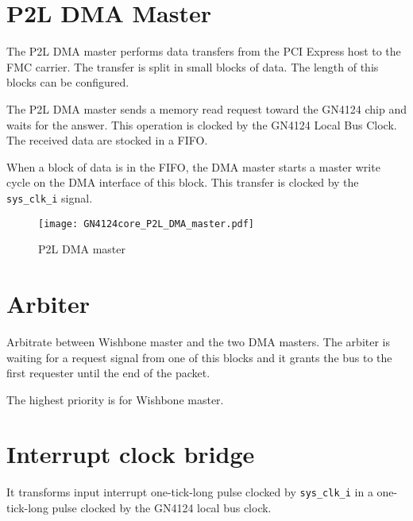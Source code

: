 \documentclass[10pt,a4paper]{cerndoc}
\begin{document}
 \section{P2L DMA Master}
The P2L DMA master performs data transfers from the PCI Express host to the FMC carrier. The transfer is split in small blocks of data. The length of this blocks can be configured.
 
The P2L DMA master sends a memory read request toward the GN4124 chip and waits for the answer. This operation is clocked by the GN4124 Local Bus Clock. The received data are stocked in a FIFO. 
 
When a block of data is in the FIFO, the DMA master starts a master write cycle on the DMA interface of this block. This transfer is clocked by the \verb+sys_clk_i+ signal. 
 
 \begin{figure}[!ht]
	\centering
		\texttt{[image: GN4124core\_P2L\_DMA\_master.pdf]}
	\caption{P2L DMA master}
	\label{fig:GN4124core_p2l_dma_master}
\end{figure}
 
 \section{Arbiter}
Arbitrate between Wishbone master and the two DMA masters. The arbiter is waiting for a request signal from one of this blocks and it grants the bus to the first requester until the end of the packet.

The highest priority is for Wishbone master.
 
  \section{Interrupt clock bridge}
  It transforms input interrupt one-tick-long pulse clocked by \verb+sys_clk_i+ in a one-tick-long pulse clocked by the GN4124 local bus clock.
\end{document}

